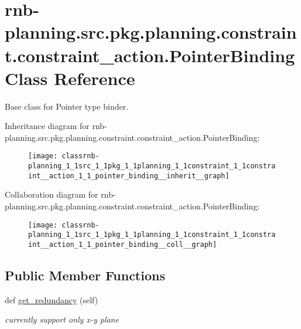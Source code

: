 \hypertarget{classrnb-planning_1_1src_1_1pkg_1_1planning_1_1constraint_1_1constraint__action_1_1_pointer_binding}{}\section{rnb-\/planning.src.\+pkg.\+planning.\+constraint.\+constraint\+\_\+action.\+Pointer\+Binding Class Reference}
\label{classrnb-planning_1_1src_1_1pkg_1_1planning_1_1constraint_1_1constraint__action_1_1_pointer_binding}


Base class for Pointer type binder.  




Inheritance diagram for rnb-\/planning.src.\+pkg.\+planning.\+constraint.\+constraint\+\_\+action.\+Pointer\+Binding\+:\nopagebreak
\begin{figure}[H]
\begin{center}
\leavevmode
\texttt{[image: classrnb-planning\_1\_1src\_1\_1pkg\_1\_1planning\_1\_1constraint\_1\_1constraint\_\_action\_1\_1\_pointer\_binding\_\_inherit\_\_graph]}
\end{center}
\end{figure}


Collaboration diagram for rnb-\/planning.src.\+pkg.\+planning.\+constraint.\+constraint\+\_\+action.\+Pointer\+Binding\+:\nopagebreak
\begin{figure}[H]
\begin{center}
\leavevmode
\texttt{[image: classrnb-planning\_1\_1src\_1\_1pkg\_1\_1planning\_1\_1constraint\_1\_1constraint\_\_action\_1\_1\_pointer\_binding\_\_coll\_\_graph]}
\end{center}
\end{figure}
\subsection*{Public Member Functions}
\begin{DoxyCompactItemize}
\item 
\mbox{\label{classrnb-planning_1_1src_1_1pkg_1_1planning_1_1constraint_1_1constraint__action_1_1_pointer_binding_a3a6f884eb8b39403fd31ad720e2ad757}} 
def \hyperlink{classrnb-planning_1_1src_1_1pkg_1_1planning_1_1constraint_1_1constraint__action_1_1_pointer_binding_a3a6f884eb8b39403fd31ad720e2ad757}{get\+\_\+redundancy} (self)
\begin{DoxyCompactList}\small\item\em currently support only x-\/y plane \end{DoxyCompactList}\end{DoxyCompactItemize}
